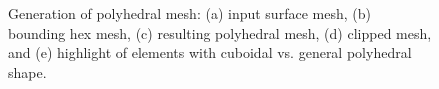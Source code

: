 \begin{figure}[htbp!]
{\label{fig:cel5}}			
\caption{Generation of polyhedral mesh: (a) input surface mesh, (b) bounding hex mesh,  (c) resulting polyhedral mesh, (d) clipped mesh, and (e) highlight of elements with cuboidal vs. general polyhedral shape.}
\label{fig:cel}
\end{figure}
\begin{figure}[htbp!]
\centering
{}		
\end{figure}
